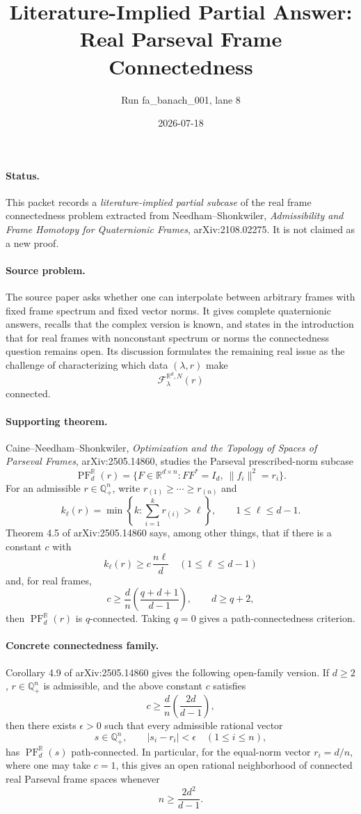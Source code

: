 \documentclass[11pt]{article}
\title{Literature-Implied Partial Answer: Real Parseval Frame Connectedness}
\author{Run fa\_banach\_001, lane 8}
\date{2026-07-18}
\newcommand{\R}{\mathbb R}
\newcommand{\Q}{\mathbb Q}
\newcommand{\PF}{\operatorname{PF}}
\newcommand{\F}{\mathcal F}
\begin{document}
\maketitle

\paragraph{Status.}
This packet records a \emph{literature-implied partial subcase} of the real frame connectedness problem extracted from Needham--Shonkwiler, \emph{Admissibility and Frame Homotopy for Quaternionic Frames}, arXiv:2108.02275. It is not claimed as a new proof.

\paragraph{Source problem.}
The source paper asks whether one can interpolate between arbitrary frames with fixed frame spectrum and fixed vector norms. It gives complete quaternionic answers, recalls that the complex version is known, and states in the introduction that for real frames with nonconstant spectrum or norms the connectedness question remains open. Its discussion formulates the remaining real issue as the challenge of characterizing which data \((\lambda,r)\) make
\[
\F_{\lambda}^{\R^d,N}(r)
\]
connected.

\paragraph{Supporting theorem.}
Caine--Needham--Shonkwiler, \emph{Optimization and the Topology of Spaces of Parseval Frames}, arXiv:2505.14860, studies the Parseval prescribed-norm subcase
\[
\PF_d^\R(r)=\{F\in \R^{d\times n}: FF^*=I_d,\ \|f_i\|^2=r_i\}.
\]
For an admissible \(r\in \Q_+^n\), write \(r_{(1)}\ge \cdots \ge r_{(n)}\) and
\[
k_\ell(r)=\min\left\{k:\sum_{i=1}^k r_{(i)}>\ell\right\},
\qquad 1\le \ell\le d-1.
\]
Theorem 4.5 of arXiv:2505.14860 says, among other things, that if there is a constant \(c\) with
\[
k_\ell(r)\ge c\,\frac{n\ell}{d}\quad (1\le \ell\le d-1)
\]
and, for real frames,
\[
c\ge \frac{d}{n}\left(\frac{q+d+1}{d-1}\right),
\qquad d\ge q+2,
\]
then \(\PF_d^\R(r)\) is \(q\)-connected. Taking \(q=0\) gives a path-connectedness criterion.

\paragraph{Concrete connectedness family.}
Corollary 4.9 of arXiv:2505.14860 gives the following open-family version. If \(d\ge 2\), \(r\in \Q_+^n\) is admissible, and the above constant \(c\) satisfies
\[
c\ge \frac{d}{n}\left(\frac{2d}{d-1}\right),
\]
then there exists \(\epsilon>0\) such that every admissible rational vector
\[
s\in \Q_+^n,\qquad |s_i-r_i|<\epsilon\quad(1\le i\le n),
\]
has \(\PF_d^\R(s)\) path-connected. In particular, for the equal-norm vector \(r_i=d/n\), where one may take \(c=1\), this gives an open rational neighborhood of connected real Parseval frame spaces whenever
\[
n\ge \frac{2d^2}{d-1}.
\]
\end{document}
